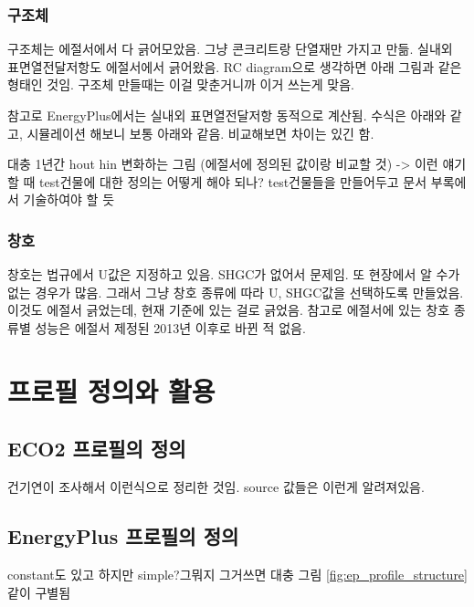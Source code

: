 \subsubsection{구조체}
구조체는 에절서에서 다 긁어모았음. 그냥 콘크리트랑 단열재만 가지고 만듦. 실내외 표면열전달저항도 에절서에서 긁어왔음. RC diagram으로 생각하면 아래 그림과 같은 형태인 것임. 구조체 만들때는 이걸 맞춘거니까 이거 쓰는게 맞음.\par
참고로 EnergyPlus에서는 실내외 표면열전달저항 동적으로 계산됨. 수식은 아래와 같고, 시뮬레이션 해보니 보통 아래와 같음. 비교해보면 차이는 있긴 함.
\begin{tcolorbox}[colback=gray!10, colframe=gray!80, boxrule=0.5pt, left=1em, right=1em]
대충 1년간 hout hin 변화하는 그림 (에절서에 정의된 값이랑 비교할 것) -> 이런 얘기할 때 test건물에 대한 정의는 어떻게 해야 되나? test건물들을 만들어두고 문서 부록에서 기술하여야 할 듯
\end{tcolorbox}

\subsubsection{창호}
창호는 법규에서 U값은 지정하고 있음. SHGC가 없어서 문제임. 또 현장에서 알 수가 없는 경우가 많음. 그래서 그냥 창호 종류에 따라 U, SHGC값을 선택하도록 만들었음.
이것도 에절서 긁었는데, 현재 기준에 있는 걸로 긁었음. 참고로 에절서에 있는 창호 종류별 성능은 에절서 제정된 2013년 이후로 바뀐 적 없음.



\section{프로필 정의와 활용}
\subsection{ECO2 프로필의 정의}
건기연이 조사해서 이런식으로 정리한 것임. source 값들은 이런게 알려져있음.

\subsection{EnergyPlus 프로필의 정의}
constant도 있고 하지만 simple?그뭐지 그거쓰면 대충 그림 \ref{fig:ep_profile_structure}\와 같이 구별됨

